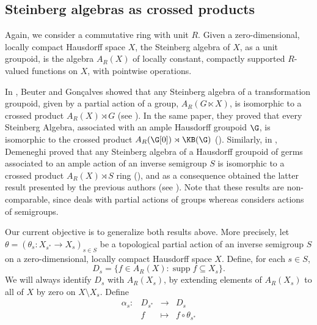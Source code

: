 %
%

\subsection{Steinberg algebras as crossed products}\label{sectiondualpartialaction}

Again, we consider a commutative ring with unit $R$. Given a zero-dimensional, locally compact Hausdorff space $X$, the Steinberg algebra of $X$, as a unit groupoid, is the algebra $A_R(X)$ of locally constant, compactly supported $R$-valued functions on $X$, with pointwise operations.

In \cite{MR3743184}, Beuter and Gonçalves showed that any Steinberg algebra of a transformation groupoid, given by a partial action of a group, $A_R(G\ltimes X)$, is isomorphic to a crossed product $A_R(X)\rtimes G$ (see \cite[Theorem~3.2]{MR3743184}). In the same paper, they proved that every Steinberg Algebra, associated with an ample Hausdorff groupoid $\G$, is isomorphic to the crossed product $A_R(\G[0])\rtimes\KB(\G)$ (\cite[Theorem~5.2]{MR3743184}). Similarly, in \cite{arxiv1710.09723v1}, Demeneghi proved that any Steinberg algebra of a Hausdorff groupoid of germs associated to an ample action of an inverse semigroup $S$ is isomorphic to a crossed product $A_R(X)\rtimes S$ ring (\cite[Theorem~2.3.6]{arxiv1710.09723v1}), and as a consequence obtained the latter result presented by the previous authors (see \cite[Proposition~2.4.3]{arxiv1710.09723v1}). Note that these results are non-comparable, since \cite{MR3743184} deals with partial actions of groups whereas \cite{arxiv1710.09723v1} considers actions of semigroups.

Our current objective is to generalize both results above. More precisely, let $\theta=\left(\theta_s:X_{s^*}\to X_s\right)_{s\in S}$ be a topological partial action of an inverse semigroup $S$ on a zero-dimensional, locally compact Hausdorff space $X$. Define, for each $s \in S$,
\[D_s=\{f \in A_R(X):\operatorname{supp}f\subseteq X_s \}.\]
We will always identify $D_s$ with $A_R(X_s)$, by extending elements of $A_R(X_s)$ to all of $X$ by zero on $X\setminus X_s$. Define
\[\begin{array}{rrcl}
 \alpha_s:& D_{s^*} &\to          &D_s\\
                 &f              & \mapsto &f \circ \theta_{s^*}
\end{array}\]

